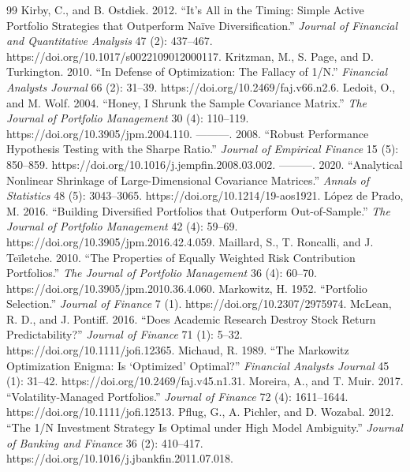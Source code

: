 \documentclass[12pt,letterpaper]{article}
\begin{document}
\begin{thebibliography}{99}
 Kirby, C., and B. Ostdiek. 2012. ``It's All in the Timing: Simple Active Portfolio Strategies that Outperform Na\"ive Diversification.'' \emph{Journal of Financial and Quantitative Analysis} 47 (2): 437–467. https://doi.org/10.1017/s0022109012000117.
 Kritzman, M., S. Page, and D. Turkington. 2010. ``In Defense of Optimization: The Fallacy of 1/N.'' \emph{Financial Analysts Journal} 66 (2): 31–39. https://doi.org/10.2469/faj.v66.n2.6.
 Ledoit, O., and M. Wolf. 2004. ``Honey, I Shrunk the Sample Covariance Matrix.'' \emph{The Journal of Portfolio Management} 30 (4): 110–119. https://doi.org/10.3905/jpm.2004.110.
 ---------. 2008. ``Robust Performance Hypothesis Testing with the Sharpe Ratio.'' \emph{Journal of Empirical Finance} 15 (5): 850–859. https://doi.org/10.1016/j.jempfin.2008.03.002.
 ---------. 2020. ``Analytical Nonlinear Shrinkage of Large-Dimensional Covariance Matrices.'' \emph{Annals of Statistics} 48 (5): 3043–3065. https://doi.org/10.1214/19-aos1921.
 L\'opez de Prado, M. 2016. ``Building Diversified Portfolios that Outperform Out-of-Sample.'' \emph{The Journal of Portfolio Management} 42 (4): 59–69. https://doi.org/10.3905/jpm.2016.42.4.059.
 Maillard, S., T. Roncalli, and J. Te\"iletche. 2010. ``The Properties of Equally Weighted Risk Contribution Portfolios.'' \emph{The Journal of Portfolio Management} 36 (4): 60–70. https://doi.org/10.3905/jpm.2010.36.4.060.
 Markowitz, H. 1952. ``Portfolio Selection.'' \emph{Journal of Finance} 7 (1). https://doi.org/10.2307/2975974.
 McLean, R. D., and J. Pontiff. 2016. ``Does Academic Research Destroy Stock Return Predictability?'' \emph{Journal of Finance} 71 (1): 5–32. https://doi.org/10.1111/jofi.12365.
 Michaud, R. 1989. ``The Markowitz Optimization Enigma: Is `Optimized' Optimal?'' \emph{Financial Analysts Journal} 45 (1): 31–42. https://doi.org/10.2469/faj.v45.n1.31.
 Moreira, A., and T. Muir. 2017. ``Volatility-Managed Portfolios.'' \emph{Journal of Finance} 72 (4): 1611–1644. https://doi.org/10.1111/jofi.12513.
 Pflug, G., A. Pichler, and D. Wozabal. 2012. ``The 1/N Investment Strategy Is Optimal under High Model Ambiguity.'' \emph{Journal of Banking and Finance} 36 (2): 410–417. https://doi.org/10.1016/j.jbankfin.2011.07.018.

\end{thebibliography}
\end{document}
